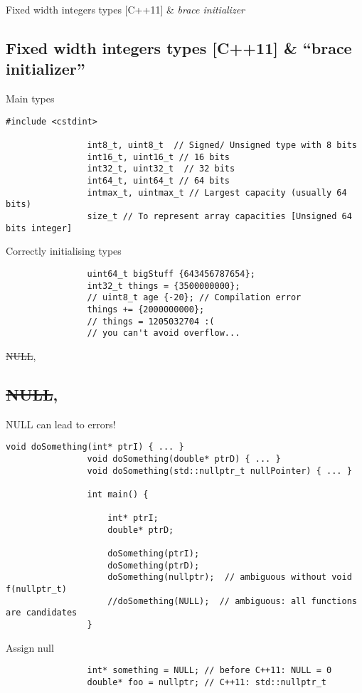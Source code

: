 \documentclass{beamer}
\newcommand{\normalSizeItem}[1] {
  \normalsize{\item #1}
}
\begin{document}
		\begin{frame}[fragile]{Fixed width integers types [C++11] \& \textit{brace initializer}}	
			\subsection{Fixed width integers types [C++11] \& ``brace initializer''}
			\begin{itemize}
			
				\normalSizeItem{Main types}
				\begin{lstlisting}[basicstyle={\tiny\ttfamily}]
				#include <cstdint>

				int8_t, uint8_t  // Signed/ Unsigned type with 8 bits
				int16_t, uint16_t // 16 bits
				int32_t, uint32_t  // 32 bits
				int64_t, uint64_t // 64 bits
				intmax_t, uintmax_t // Largest capacity (usually 64 bits)
				size_t // To represent array capacities [Unsigned 64 bits integer]
				\end{lstlisting}
								
				\normalSizeItem { Correctly initialising types }
				\begin{lstlisting}
				uint64_t bigStuff {643456787654};
				int32_t things = {3500000000};
				// uint8_t age {-20}; // Compilation error
				things += {2000000000};
				// things = 1205032704 :(
				// you can't avoid overflow...
				\end{lstlisting}
				
			\end{itemize}
		\end{frame}
		
		\begin{frame}[fragile]{\sout{NULL}, }	
			\subsection{\sout{NULL}, }
			\begin{itemize}
			
				\normalSizeItem { NULL can lead to errors! }
				\begin{lstlisting}[basicstyle={\tiny\ttfamily}]
				void doSomething(int* ptrI) { ... }
				void doSomething(double* ptrD) { ... }
				void doSomething(std::nullptr_t nullPointer) { ... } 
				
				int main() {
				
					int* ptrI;
					double* ptrD;
				 
					doSomething(ptrI);
					doSomething(ptrD);
					doSomething(nullptr);  // ambiguous without void f(nullptr_t)
					//doSomething(NULL);  // ambiguous: all functions are candidates
				}
				\end{lstlisting}
				
				\normalSizeItem { Assign null}
				\begin{lstlisting}
				int* something = NULL; // before C++11: NULL = 0
				double* foo = nullptr; // C++11: std::nullptr_t
				\end{lstlisting}
				
			\end{itemize}
		\end{frame}
		
\end{document}
